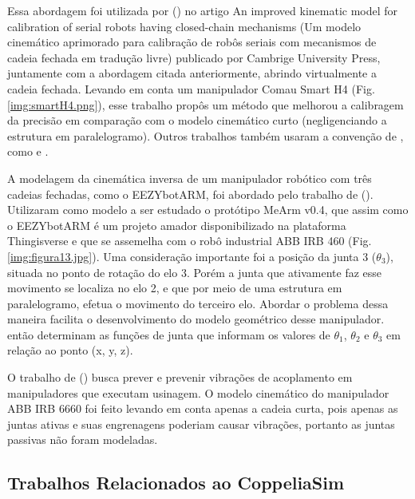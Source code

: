 Essa abordagem foi utilizada por  (\citeyear{towebb2012}) no artigo An improved kinematic model for calibration of serial robots having closed-chain mechanisms (Um modelo cinemático aprimorado para calibração de robôs seriais com mecanismos de cadeia fechada em tradução livre) publicado por Cambrige University Press, juntamente com a abordagem citada anteriormente, abrindo  virtualmente a cadeia fechada. Levando em conta um manipulador Comau Smart H4 (Fig. \ref{img:smartH4.png}), esse trabalho propôs um método que melhorou a calibragem da precisão em comparação com o modelo cinemático curto (negligenciando  a estrutura em paralelogramo). Outros trabalhos também usaram a convenção de , como  e .


A modelagem da cinemática inversa de um manipulador robótico com três cadeias fechadas, como o EEZYbotARM, foi abordado pelo trabalho de  (\citeyear{costa2017}). Utilizaram como modelo a ser estudado o protótipo MeArm v0.4, que assim como o EEZYbotARM é um projeto amador disponibilizado na plataforma Thingisverse e que se assemelha com o robô industrial ABB IRB 460 (Fig. \ref{img:figura13.jpg}). Uma consideração importante foi a posição da junta 3 ($\theta_3$), situada no ponto de rotação do elo 3. Porém a junta que ativamente faz esse movimento se localiza no elo 2, e que por meio de uma estrutura em paralelogramo, efetua o movimento do terceiro elo. Abordar o problema dessa maneira facilita o desenvolvimento do modelo geométrico desse manipulador.  então determinam as funções de junta que informam os valores de $\theta_1$, $\theta_2$ e $\theta_3$ em relação ao ponto (x, y, z).


O trabalho de  (\citeyear{gienke2019}) busca prever e prevenir vibrações de acoplamento em manipuladores que executam usinagem. O modelo cinemático do manipulador ABB IRB 6660 foi feito levando em conta apenas a cadeia curta, pois apenas as juntas ativas e suas engrenagens poderiam causar vibrações, portanto as juntas passivas não foram modeladas.

\subsection{Trabalhos Relacionados ao CoppeliaSim}

